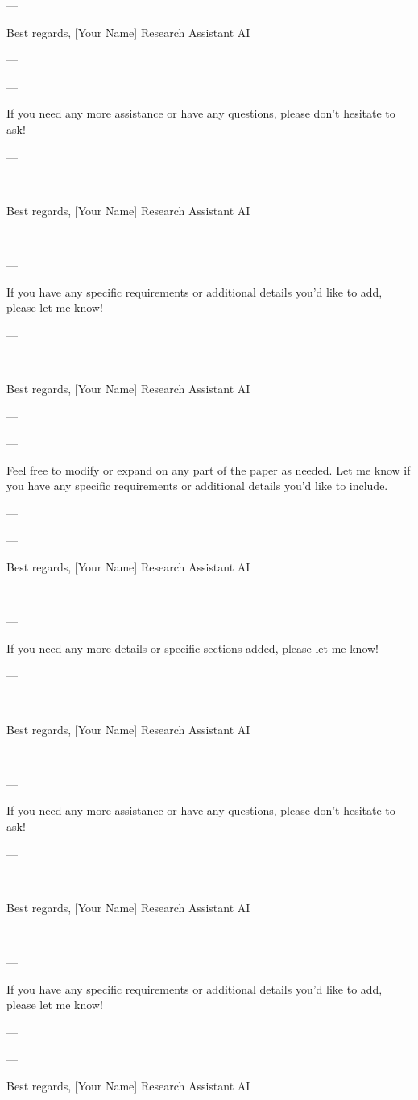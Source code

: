---

Best regards,  
[Your Name]  
Research Assistant AI

--- 

---

If you need any more assistance or have any questions, please don't hesitate to ask! 

--- 

---

Best regards,  
[Your Name]  
Research Assistant AI

--- 

---

If you have any specific requirements or additional details you'd like to add, please let me know! 

--- 

---

Best regards,  
[Your Name]  
Research Assistant AI

--- 

---

Feel free to modify or expand on any part of the paper as needed. Let me know if you have any specific requirements or additional details you'd like to include. 

--- 

---

Best regards,  
[Your Name]  
Research Assistant AI

--- 

---

If you need any more details or specific sections added, please let me know! 

--- 

---

Best regards,  
[Your Name]  
Research Assistant AI

--- 

---

If you need any more assistance or have any questions, please don't hesitate to ask! 

--- 

---

Best regards,  
[Your Name]  
Research Assistant AI

--- 

---

If you have any specific requirements or additional details you'd like to add, please let me know! 

--- 

---

Best regards,  
[Your Name]  
Research Assistant AI

